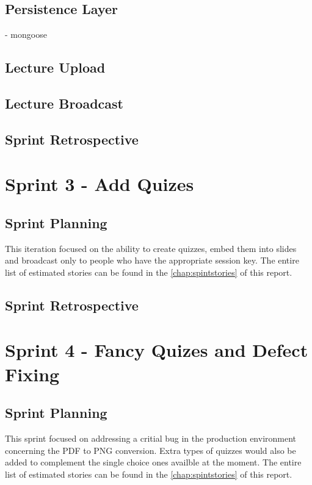 \subsection{Persistence Layer}
- mongoose

\subsection{Lecture Upload}

\subsection{Lecture Broadcast}

\subsection{Sprint Retrospective}


\section{Sprint 3 - Add Quizes}
\subsection{Sprint Planning}
This iteration focused on the ability to create quizzes, embed them into slides and
broadcast only to people who have the appropriate session key. The entire list of estimated stories
can be found in the \autoref{chap:spintstories} of this report.

\subsection{Sprint Retrospective}


\section{Sprint 4 - Fancy Quizes and Defect Fixing}
\subsection{Sprint Planning}
This sprint focused on addressing a critial bug in the production environment
concerning the PDF to PNG conversion. Extra types of quizzes would also be added
to complement the single choice ones availble at the moment. The entire list of estimated stories
can be found in the \autoref{chap:spintstories} of this report.

